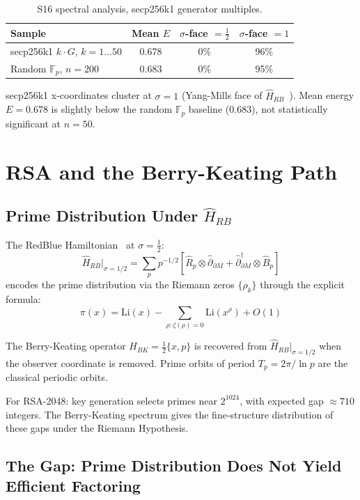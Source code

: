 \documentclass[runningheads]{llncs}
\theoremstyle{plain}
\theoremstyle{definition}
\newcommand{\Fp}{\mathbb{F}_p}
\begin{document}
\begin{table}[h]
\centering
\caption{S16 spectral analysis, secp256k1 generator multiples.}
\label{tab:s16}
\begin{tabular}{lccc}
\toprule
Sample & Mean $E$ & $\sigma$-face $= \frac{1}{2}$ & $\sigma$-face $= 1$ \\
\midrule
secp256k1 $k \cdot G$, $k=1\ldots 50$ & 0.678 & 0\% & 96\% \\
Random $\Fp$, $n=200$ & 0.683 & 0\% & 95\% \\
\bottomrule
\end{tabular}
\end{table}

secp256k1 x-coordinates cluster at $\sigma = 1$ (Yang-Mills face of
$\hat{H}_{RB}$~\cite{Allison2026}). Mean energy $E = 0.678$ is slightly
below the random $\Fp$ baseline ($0.683$), not statistically significant
at $n=50$.


\section{RSA and the Berry-Keating Path}
\label{sec:rsa}

\subsection{Prime Distribution Under $\hat{H}_{RB}$}

The RedBlue Hamiltonian~\cite{Allison2026} at $\sigma = \frac{1}{2}$:
\[
\hat{H}_{RB}\big|_{\sigma=1/2} = \sum_p p^{-1/2}
\left[\hat{R}_p \otimes \hat{\partial}_{\partial M} +
\hat{\partial}_{\partial M}^\dagger \otimes \hat{B}_p\right]
\]
encodes the prime distribution via the Riemann zeros $\{\rho_k\}$ through the
explicit formula:
\[
\pi(x) = \mathrm{Li}(x) - \sum_{\rho: \zeta(\rho)=0} \mathrm{Li}(x^\rho) + O(1)
\]

The Berry-Keating operator $H_{BK} = \frac{1}{2}\{x, p\}$ is recovered
from $\hat{H}_{RB}|_{\sigma=1/2}$ when the observer coordinate is removed.
Prime orbits of period $T_p = 2\pi / \ln p$ are the classical periodic orbits.

For RSA-2048: key generation selects primes near $2^{1024}$, with expected
gap $\approx 710$ integers. The Berry-Keating spectrum gives the fine-structure
distribution of these gaps under the Riemann Hypothesis.

\subsection{The Gap: Prime Distribution Does Not Yield Efficient Factoring}
\label{sec:gap}
\end{document}
